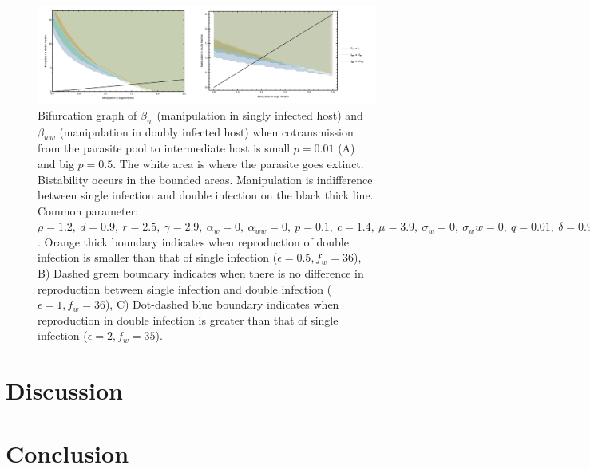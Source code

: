 \documentclass[11pt]{article}
\begin{document}
\begin{figure}[!ht]
\includegraphics[width=\textwidth]{Figures/manip_bifurcation.jpeg}
\caption{Bifurcation graph of $\beta_w$ (manipulation in singly infected host) and $\beta_{ww}$ (manipulation in doubly infected host) when cotransmission from the parasite pool to intermediate host is small $p = 0.01$ (A) and big $p = 0.5$. The white area is where the parasite goes extinct. Bistability occurs in the bounded areas. Manipulation is indifference between single infection and double infection on the black thick line. Common parameter:  $\rho = 1.2, \ d = 0.9, \ r = 2.5, \ \gamma = 2.9, \ \alpha_w = 0, \ \alpha_{ww} = 0, \ p = 0.1, \ c = 1.4, \ \mu = 3.9, \ \sigma_w = 0, \ \sigma_ww = 0, \ q = 0.01, \ \delta = 0.9, \ k = 0.26, \ \epsilon = 0.5$. Orange thick boundary indicates when reproduction of double infection is smaller than that of single infection ($\epsilon = 0.5, f_w = 36$), B) Dashed green boundary indicates when there is no difference in reproduction between single infection and double infection ($\epsilon = 1, f_w = 36$), C) Dot-dashed blue boundary indicates when reproduction in double infection is greater than that of single infection ($\epsilon = 2, f_w = 35$).}
\label{fig:manipbifur}
\end{figure}


\section*{Discussion}


\section*{Conclusion}


\end{document}
